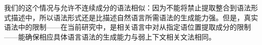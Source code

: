     我们的这个情况与允许不连续成分的语法相似：因为不能将禁止提取整合到语法形式描述中，所以语法形式还是比描述自然语言所需语法的生成能力强。但是，真实语法中的限制——在当前研究中，是相关语言中对从指定语位置提取成分的限制——能确保相应具体语言语法的生成能力与弱上下文相关文法相同。



